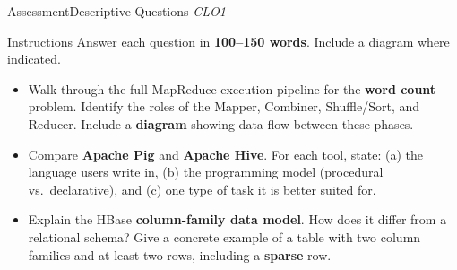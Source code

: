 \documentclass[aspectratio=169,10pt]{beamer}
\begin{document}
\begin{frame}{Assessment\textemdash Descriptive Questions \hfill\small\textit{CLO1}}
  \begin{block}{Instructions}
    Answer each question in \textbf{100--150 words}.  Include a diagram where indicated.
  \end{block}
  \vspace{8pt}
  \begin{itemize}
    \item[\textbf{D1.}] Walk through the full MapReduce execution pipeline for the \textbf{word count} problem.  Identify the roles of the Mapper, Combiner, Shuffle/Sort, and Reducer.  Include a \textbf{diagram} showing data flow between these phases.
  \end{itemize}
  \vspace{8pt}
  \begin{itemize}
    \item[\textbf{D2.}] Compare \textbf{Apache Pig} and \textbf{Apache Hive}.  For each tool, state: (a) the language users write in, (b) the programming model (procedural vs.\ declarative), and (c) one type of task it is better suited for.
  \end{itemize}
  \vspace{8pt}
  \begin{itemize}
    \item[\textbf{D3.}] Explain the HBase \textbf{column-family data model}.  How does it differ from a relational schema?  Give a concrete example of a table with two column families and at least two rows, including a \textbf{sparse} row.
  \end{itemize}
\end{frame}
\end{document}
